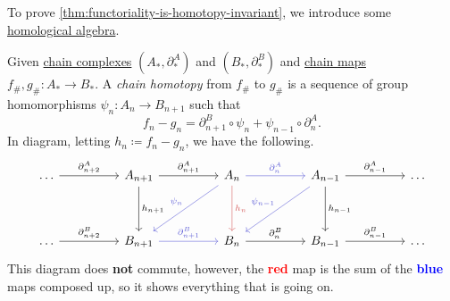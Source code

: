 To prove \autoref{thm:functoriality-is-homotopy-invariant}, we introduce some \hyperref[sec:homological-algebra]{homological algebra}.

\begin{definition}\label{def:chain-homotopy}
	Given \hyperref[def:chain-complex]{chain complexes} \((A_\ast, \partial ^A_\ast)\) and \((B_\ast, \partial^B_\ast)\) and \hyperref[def:chain-map]{chain maps} \(f_\#, g_\# \colon  A_\ast \to B_\ast\). A \emph{chain homotopy} from \(f_\#\) to \(g_\#\) is a sequence of group homomorphisms \(\psi_n\colon A_n \to B_{n + 1}\) such that
	\[
		f_n - g_n = \partial ^B_{n + 1} \circ \psi_n + \psi_{n - 1} \circ \partial _n^A.
	\]
	In diagram, letting \(h_n \coloneqq f_n - g_n\), we have the following.
	\[
		\begin{tikzcd}
			\dots && {A_{n+1}} && {A_{n}} && {A_{n-1}} && \dots \\
			\\
			\dots && {B_{n+1}} && {B_{n}} && {B_{n-1}} && \dots
			\arrow["{\partial^A_{n-1}}", from=1-7, to=1-9]
			\arrow["{\partial^B_{n-1}}", from=3-7, to=3-9]
			\arrow["{\partial^A_{n}}", color={rgb,255:red,92;green,92;blue,214}, from=1-5, to=1-7]
			\arrow["{\partial^B_{n}}", from=3-5, to=3-7]
			\arrow["{\partial^B_{n+1}}", color={rgb,255:red,92;green,92;blue,214}, from=3-3, to=3-5]
			\arrow["{\partial^A_{n+2}}", from=1-1, to=1-3]
			\arrow["{\partial^B_{n+2}}", from=3-1, to=3-3]
			\arrow["{h_{n+1}}", from=1-3, to=3-3]
			\arrow["{h_{n}}", color={rgb,255:red,214;green,92;blue,92}, from=1-5, to=3-5]
			\arrow["{h_{n-1}}", from=1-7, to=3-7]
			\arrow["{\partial^A_{n+1}}", from=1-3, to=1-5]
			\arrow["{\psi_n}"', color={rgb,255:red,92;green,92;blue,214}, from=1-5, to=3-3]
			\arrow["{\psi_{n-1}}"', color={rgb,255:red,92;green,92;blue,214}, from=1-7, to=3-5]
		\end{tikzcd}
	\]
	This diagram does \textbf{not} commute, however, the \textbf{\textcolor{red}{red}} map is the sum of the \textbf{\textcolor{blue}{blue}} maps composed up, so it shows everything that is going on.
\end{definition}

